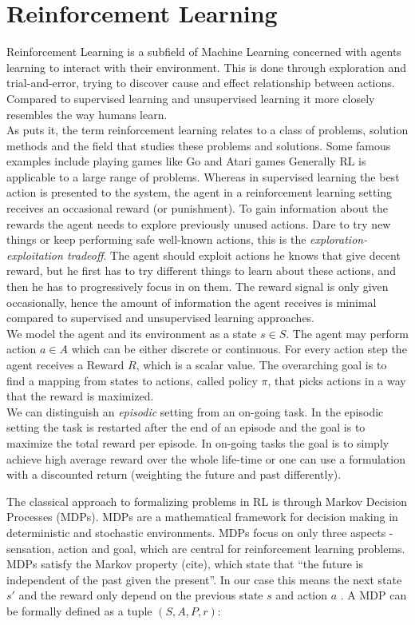 \section{Reinforcement Learning}
Reinforcement Learning is a subfield of Machine Learning concerned with agents
learning to interact with their environment.
This is done through exploration and trial-and-error, trying to discover
cause and effect relationship between actions.
Compared to supervised learning and unsupervised learning it
more closely resembles the way humans learn. \\
As \citet{sutton2018reinforcement} puts it,
the term reinforcement learning relates to a class of problems,
solution methods and the field that studies these problems and solutions.
Some famous examples include playing games like Go
\citet{silver2016mastering} and Atari games \citet{mnih2013playing}
Generally RL is applicable to a large range of problems.
Whereas in supervised learning the best action is presented to the system,
the agent in a reinforcement learning setting receives an occasional
reward (or punishment).
To gain information about the rewards the agent needs
to explore previously unused actions.
Dare to try new things or keep performing safe
well-known actions, this is the \textit{exploration-exploitation tradeoff}.
The agent should exploit actions he knows that
give decent reward, but he first
has to try different things to learn about these actions,
and then he has to progressively focus in on them.
The reward signal is only given occasionally, hence the amount of information
the agent receives is minimal compared to
supervised and unsupervised learning approaches. \\
We model the agent and its environment as a state $s \in S$. The agent
may perform action $ a \in A$ which can be either discrete or continuous.
For every action step the agent receives a Reward $R$,
which is a scalar value.
The overarching goal is to find a mapping from states to actions,
called policy $\pi$, that picks actions in a way that
the reward is maximized. \\
We can distinguish an \textit{episodic} setting
from an on-going task.
In the episodic setting
the task is restarted after
the end of an episode and the goal is
to maximize the total reward per episode.
In on-going tasks the goal
is to simply achieve high average reward over
the whole life-time or one can use a formulation
with a discounted return (weighting the
future and past differently).

The classical approach to formalizing problems in RL is through
Markov Decision Processes (MDPs).
MDPs are a mathematical
framework for decision making in deterministic and stochastic environments.
MDPs focus on only three aspects
- sensation, action and goal, which are central
for reinforcement learning problems.
MDPs satisfy the Markov property (cite), which state that ``the future is independent
of the past given the present''. In our case this means the next state $s'$ and the reward
only depend on the previous state $s$ and action $a$ \citet{sutton1992reinforcement}.
A MDP can be formally defined as a tuple $(S, A, P, r)$:

